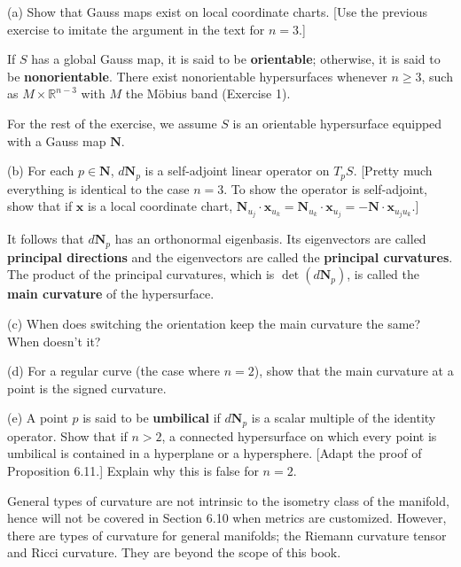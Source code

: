\documentclass[leqno]{book}
\begin{document}
\begin{enumerate}
(a) Show that Gauss maps exist on local coordinate charts.  [Use the previous exercise to imitate the argument in the text for $n=3$.]

If $S$ has a global Gauss map, it is said to be \textbf{orientable}; otherwise, it is said to be \textbf{nonorientable}.  There exist nonorientable hypersurfaces whenever $n\geqslant 3$, such as $M\times\mathbb R^{n-3}$ with $M$ the M\"obius band (Exercise 1).

For the rest of the exercise, we assume $S$ is an orientable hypersurface equipped with a Gauss map $\mathbf N$.

(b) For each $p\in\mathbf N$, $d\mathbf N_p$ is a self-adjoint linear operator on $T_pS$.  [Pretty much everything is identical to the case $n=3$.  To show the operator is self-adjoint, show that if $\mathbf x$ is a local coordinate chart, $\mathbf N_{u_j}\cdot\mathbf x_{u_k}=\mathbf N_{u_k}\cdot\mathbf x_{u_j}=-\mathbf N\cdot\mathbf x_{u_ju_k}$.]

It follows that $d\mathbf N_p$ has an orthonormal eigenbasis.  Its eigenvectors are called \textbf{principal directions} and the eigenvectors are called the \textbf{principal curvatures}.  The product of the principal curvatures, which is $\det(d\mathbf N_p)$, is called the \textbf{main curvature} of the hypersurface.

(c) When does switching the orientation keep the main curvature the same?  When doesn't it?

(d) For a regular curve (the case where $n=2$), show that the main curvature at a point is the signed curvature.

(e) A point $p$ is said to be \textbf{umbilical} if $d\mathbf N_p$ is a scalar multiple of the identity operator.  Show that if $n>2$, a connected hypersurface on which every point is umbilical is contained in a hyperplane or a hypersphere.  [Adapt the proof of Proposition 6.11.]  Explain why this is false for $n=2$.

General types of curvature are not intrinsic to the isometry class of the manifold, hence will not be covered in Section 6.10 when metrics are customized.  However, there are types of curvature for general manifolds; the Riemann curvature tensor and Ricci curvature.  They are beyond the scope of this book. %
\end{enumerate}
\end{document}
